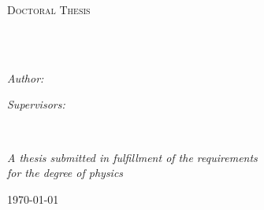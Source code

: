\documentclass[
11pt, %
english, %
singlespacing, %
headsepline, %
]{MastersDoctoralThesis} %
\begin{document}
\begin{titlepage}
\begin{center}

\vspace*{.06\textheight}
{\scshape\LARGE \univname\par}\vspace{1.5cm} %
\textsc{\Large Doctoral Thesis}\\[0.5cm] %

\HRule \\[0.4cm] %
{\huge \bfseries \ttitle\par}\vspace{0.4cm} %
\HRule \\[1.5cm] %
 
\begin{minipage}[t]{0.4\textwidth}
\begin{flushleft} \large
\emph{Author:}\\
\href{http://www.johnsmith.com}{\authorname} %
\end{flushleft}
\end{minipage}
\begin{minipage}[t]{0.4\textwidth}
\begin{flushright} \large
\emph{Supervisors:} \\
\href{http://www.jamessmith.com}{\supname} %
\end{flushright}
\end{minipage}\\[3cm]
 
\vfill

\large \textit{A thesis submitted in fulfillment of the requirements\\ for the degree of physics}\\[0.3cm] %
 
\vfill

{\large \today}\\[4cm] %
 
\vfill
\end{center}
\end{titlepage}
\end{document}
